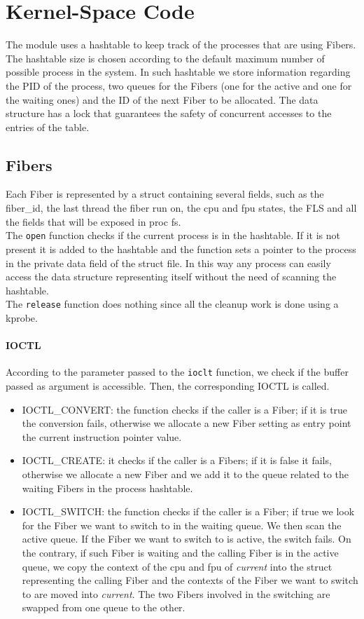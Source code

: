 \documentclass[11pt]{article}
\begin{document}
\section{Kernel-Space Code} 
The module uses a hashtable to keep track of the processes that are using Fibers. The hashtable size is chosen according to the default maximum number of possible process in the system. In such hashtable we store information regarding the PID of the process, two queues for the Fibers (one for the active and one for the waiting ones) and the ID of the next Fiber to be allocated. The data structure has a lock that guarantees the safety of concurrent accesses to the entries of the table.

\subsection{Fibers}
Each Fiber is represented by a struct containing several fields, such as the fiber\_id, the last thread the fiber run on, the cpu and fpu states, the FLS and all the fields that will be exposed in proc fs.\\
The \texttt{open} function checks if the current process is in the hashtable. If it is not present it is added to the hashtable and the function sets a pointer to the process in the private data field of the struct file. In this way any process can easily access the data structure representing itself without the need of scanning the hashtable.\\
The \texttt{release} function does nothing since all the cleanup work is done using a kprobe.\\
\paragraph{IOCTL}
According to the parameter passed to the \texttt{ioclt} function, we check if the buffer passed as argument is accessible. Then, the corresponding IOCTL is called.
\begin{itemize}
\item IOCTL\_CONVERT: the function checks if the caller is a Fiber; if it is true the conversion fails, otherwise we allocate a new Fiber setting as entry point the current instruction pointer value.
\item IOCTL\_CREATE: it checks if the caller is a Fibers; if it is false it fails, otherwise we allocate a new Fiber and we add it to the queue related to the waiting Fibers in the process hashtable. 
\item IOCTL\_SWITCH: the function checks if the caller is a Fiber; if true we look for the Fiber we want to switch to in the waiting queue. We then scan the active queue. If the Fiber we want to switch to is active, the switch fails. On the contrary, if such Fiber is waiting and the calling Fiber is in the active queue, we copy the context of the cpu and fpu of \textit{current} into the struct representing the calling Fiber and the contexts of the Fiber we want to switch to are moved into \textit{current}. The two Fibers involved in the switching are swapped from one queue to the other.
\end{itemize}
\end{document}
